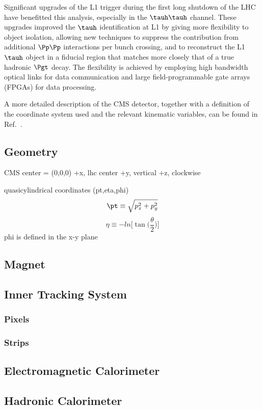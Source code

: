 Significant upgrades of the L1 trigger during the first long shutdown of the LHC have benefitted this analysis, especially in the $\tauh\tauh$ channel. These upgrades improved the $\tauh$ identification at L1 by giving more flexibility to object isolation, allowing new techniques to suppress the contribution from additional $\Pp\Pp$ interactions per bunch
crossing, and to reconstruct the L1 $\tauh$ object in a fiducial region that matches more closely that of a true hadronic $\Pgt$ decay. The flexibility is achieved by employing high bandwidth optical links for data communication and large field-programmable gate arrays (FPGAs) for data processing.

A more detailed description of the CMS detector, together with a definition of the coordinate system used and the relevant kinematic variables, can be found in Ref.~\cite{Chatrchyan:2008zzk}.

\subsection{Geometry}
CMS center = (0,0,0)
+x, lhc center
+y, vertical
+z, clockwise

quasicylindrical coordinates (pt,eta,phi)
\begin{equation}
\pt \equiv \sqrt{p^{2}_{x} + p^{2}_{y}}
\end{equation}
\begin{equation}
\eta \equiv -ln\bigg[\tan\bigg(\frac{\theta}{2}\bigg)\bigg]
\end{equation}
phi is defined in the x-y plane

\subsection{Magnet}
\subsection{Inner Tracking System}
\subsubsection{Pixels}
\subsubsection{Strips}
\subsection{Electromagnetic Calorimeter}
\subsection{Hadronic Calorimeter}
